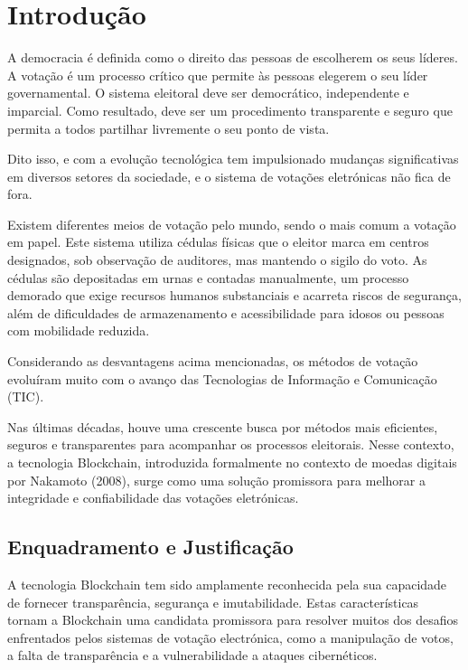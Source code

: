 \chapter{Introdução}\label{cap1}
\justifying
A democracia é definida como o direito das pessoas de escolherem os seus líderes. A votação é um processo crítico que permite às pessoas elegerem o seu líder governamental. O sistema eleitoral deve ser democrático, independente e imparcial. Como resultado, deve ser um procedimento transparente e seguro que permita a todos partilhar livremente o seu ponto de vista.\cite{alvi_dvtchain_2022}

Dito isso, e com a evolução tecnológica tem impulsionado mudanças significativas em diversos setores da sociedade, e o sistema de votações eletrónicas não fica de fora.

Existem diferentes meios de votação pelo mundo, sendo o mais comum a votação em papel. Este sistema utiliza cédulas físicas que o eleitor marca em centros designados, sob observação de auditores, mas mantendo o sigilo do voto. As cédulas são depositadas em urnas e contadas manualmente, um processo demorado que exige recursos humanos substanciais e acarreta riscos de segurança, além de dificuldades de armazenamento e acessibilidade para idosos ou pessoas com mobilidade reduzida.\cite{hajian_berenjestanaki_blockchain-based_2024}

Considerando as desvantagens acima mencionadas, os métodos de votação evoluíram muito com o avanço das Tecnologias de Informação e Comunicação (TIC).

Nas últimas décadas, houve uma crescente busca por métodos mais eficientes, seguros e transparentes para acompanhar os processos eleitorais. Nesse contexto, a tecnologia Blockchain, introduzida formalmente no contexto de moedas digitais por Nakamoto (2008)\cite{nakamoto2008bitcoin}, surge como uma solução promissora para melhorar a integridade e confiabilidade das votações eletrónicas.

\newpage

\section{Enquadramento e Justificação}

A tecnologia Blockchain tem sido amplamente reconhecida pela sua capacidade de fornecer transparência, segurança e imutabilidade. Estas características tornam a Blockchain uma candidata promissora para resolver muitos dos desafios enfrentados pelos sistemas de votação electrónica, como a manipulação de votos, a falta de transparência e a vulnerabilidade a ataques cibernéticos.

